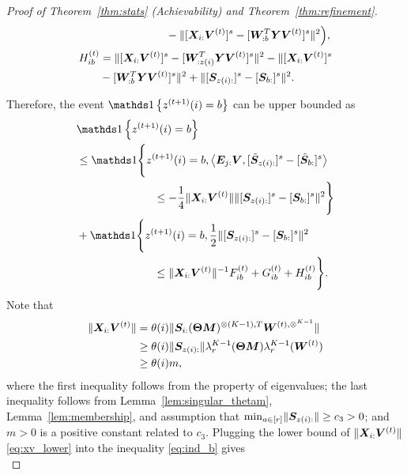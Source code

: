 \documentclass[journal]{IEEEtran}
\theoremstyle{definition}
\theoremstyle{definition}
\newcommand{\offf}[1]{\left\{#1\right\}}
\newcommand{\ang}[1]{\left\langle#1\right\rangle}
\begin{document}
\begin{proof}[Proof of Theorem~\ref{thm:stats} (Achievability) and Theorem~\ref{thm:refinement}]
\begin{align}
        & \quad \quad \quad \quad \quad \quad   -  \onormSize{}{ [\mX_{i:} \mV^{(t)}]^s -  [  \mW_{:b}^T \mY \mV^{(t)} ]^s}^2 \Big), \label{eq:g} \\
        H_{ib}^{(t)} &=   \onormSize{}{ [\mX_{i:} \mV^{(t)}]^s -  [  \mW_{:z(i)}^T \mY \mV^{(t)} ]^s}^2 - \onormSize{}{ [\mX_{i:} \mV^{(t)}]^s \\
        & -  [  \mW_{:b}^T \mY \mV^{(t)} ]^s}^2  + \onormSize{}{ [ \mS_{z(i):}  ]^s - [ \mS_{b:}  ]^s  }^2 . \label{eq:h}
    \end{align}
    \normalsize

   Therefore, the event $ \ind \offf{ z^{(t+1)}(i) = b }$ can be upper bounded as
   \small
    \begin{align}
         & \ind \offf{ z^{(t+1)}(i) = b  }\\
         & \leq \ind \Bigg\{ z^{(t+1)}(i) = b ,   \ang{ \mE_{j:} \mV, [  \tilde \mS_{z(i):} ]^s - [  \tilde \mS_{b:} ]^s }  \\
         & \quad \quad \quad \quad \quad \quad \quad  \leq - \frac{1}{4} \onormSize{}{\mX_{i:} \mV^{(t)}} \onormSize{}{ [ \mS_{z(i):}  ]^s - [ \mS_{b:}  ]^s  }^2 \Bigg\} \\
         & + \ind \Bigg\{z^{(t+1)}(i) = b, \frac{1}{2}\onormSize{}{ [ \mS_{z(i):}  ]^s - [ \mS_{b:}  ]^s  }^2 \\
         & \quad \quad \quad \quad \quad \quad \quad \leq \onormSize{}{\mX_{i:} \mV^{(t)}}^{-1} F_{ib}^{(t)} + G_{ib}^{(t)} + H_{ib}^{(t)} \Bigg\}. \label{eq:ind_b}
    \end{align}
    \normalsize
   Note that 
    \begin{align}
     \onormSize{}{\mX_{i:} \mV^{(t)}}  &= \theta(i) \onormSize{}{\mS_{i:} (\mTheta \mM)^{\otimes (K-1),T} \mW^{(t), \otimes^{K-1}}}\\
         &\geq \theta(i) \onormSize{}{\mS_{z(i):}} \lambda_r^{K-1}(\mTheta \mM) \lambda^{K-1}_r(\mW^{(t)})\\
         &\geq\theta(i) m , \label{eq:xv_lower}
    \end{align}
    where the first inequality follows from the property of eigenvalues; the last inequality follows from Lemma~\ref{lem:singular_thetam}, Lemma~\ref{lem:membership}, and assumption that $\min_{a \in [r]} \lVert\bm S_{z(i):}\rVert \geq c_3>0$; and $m >0$ is a positive constant related to $ c_3$. Plugging the lower bound of $ \lVert\bm X_{i:} \bm{V}^{(t)}\rVert$ \eqref{eq:xv_lower} into the inequality \eqref{eq:ind_b} gives
    \begin{equation}\label{eq:decomp1}

\end{equation}
\end{proof}
\end{document}
